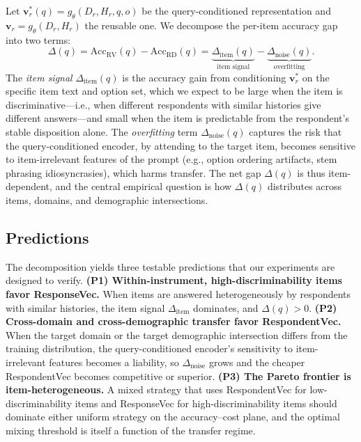 Let $\mathbf{v}^\ast_r(q) = g_\theta(D_r, H_r, q, o)$ be the query-conditioned representation and $\mathbf{v}_r = g_\theta(D_r, H_r)$ the reusable one. We decompose the per-item accuracy gap into two terms:
\begin{equation}
\label{eq:gap}
\Delta(q) = \text{Acc}_{\text{RV}}(q) - \text{Acc}_{\text{RD}}(q) = \underbrace{\Delta_{\text{item}}(q)}_{\text{item signal}} - \underbrace{\Delta_{\text{noise}}(q)}_{\text{overfitting}}.
\end{equation}
The \emph{item signal} $\Delta_{\text{item}}(q)$ is the accuracy gain from conditioning $\mathbf{v}^\ast_r$ on the specific item text and option set, which we expect to be large when the item is discriminative---i.e., when different respondents with similar histories give different answers---and small when the item is predictable from the respondent's stable disposition alone. The \emph{overfitting} term $\Delta_{\text{noise}}(q)$ captures the risk that the query-conditioned encoder, by attending to the target item, becomes sensitive to item-irrelevant features of the prompt (e.g., option ordering artifacts, stem phrasing idiosyncrasies), which harms transfer. The net gap $\Delta(q)$ is thus item-dependent, and the central empirical question is how $\Delta(q)$ distributes across items, domains, and demographic intersections.

\subsection{Predictions}

The decomposition yields three testable predictions that our experiments are designed to verify. \textbf{(P1) Within-instrument, high-discriminability items favor ResponseVec.} When items are answered heterogeneously by respondents with similar histories, the item signal $\Delta_{\text{item}}$ dominates, and $\Delta(q) > 0$. \textbf{(P2) Cross-domain and cross-demographic transfer favor RespondentVec.} When the target domain or the target demographic intersection differs from the training distribution, the query-conditioned encoder's sensitivity to item-irrelevant features becomes a liability, so $\Delta_{\text{noise}}$ grows and the cheaper RespondentVec becomes competitive or superior. \textbf{(P3) The Pareto frontier is item-heterogeneous.} A mixed strategy that uses RespondentVec for low-discriminability items and ResponseVec for high-discriminability items should dominate either uniform strategy on the accuracy--cost plane, and the optimal mixing threshold is itself a function of the transfer regime.

